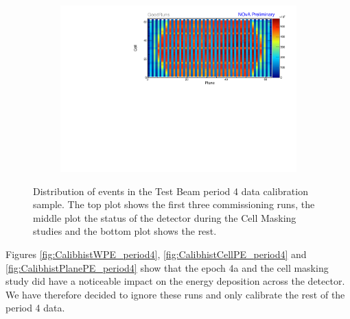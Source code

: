 \begin{figure}[!hbtp]
\begin{subfigure}[b]{\textwidth}
\includegraphics[width=\textwidth]{Plots/TBCalibration/Attenprofs_P4Data_CellPlane_GoodRuns.pdf}
\end{subfigure}
\caption[Plane-Cell distribution of hits for the period 4 data sample]{Distribution of events in the Test Beam period 4 data calibration sample. The top plot shows the first three commissioning runs, the middle plot the status of the detector during the Cell Masking studies and the bottom plot shows the rest.}
\label{fig:Calibhist_period4}
\end{figure}

Figures \ref{fig:CalibhistWPE_period4}, \ref{fig:CalibhistCellPE_period4} and \ref{fig:CalibhistPlanePE_period4} show that the epoch 4a and the cell masking study did have a noticeable impact on the energy deposition across the detector. We have therefore decided to ignore these runs and only calibrate the rest of the period 4 data.

